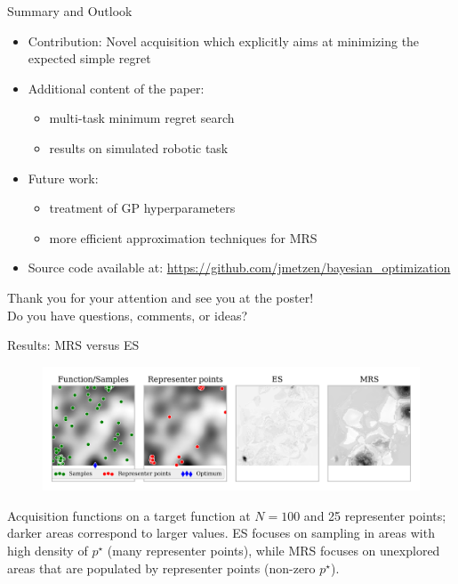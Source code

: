 \documentclass[11pt]{beamer}
\begin{document}
\begin{frame}{Summary and Outlook}
  
  \begin{itemize}
    \item Contribution: Novel acquisition which explicitly aims at minimizing the expected simple regret
    \pause
    \item Additional content of the paper:
    \begin{itemize}
      \item multi-task minimum regret search
      \item results on simulated robotic task
    \end{itemize}
    \pause
    \item Future work:
    \begin{itemize}
      \item treatment of GP hyperparameters
      \item more efficient approximation techniques for MRS
    \end{itemize}
    \pause
    \item Source code available at: \url{https://github.com/jmetzen/bayesian_optimization}
  \end{itemize}

  \vspace*{1cm}
  \pause
  \begin{center}
   Thank you for your attention and see you at the poster! \\
   Do you have questions, comments, or ideas?
   \end{center}

\end{frame}

\appendix

\begin{frame}[noframenumbering]{Results: MRS versus ES}
\begin{figure}
\centering
\includegraphics[width=.8\textwidth]{../pics/es_analysis}
\label{fig:es_analysis}
\end{figure}

Acquisition functions on a target function at $N=100$ and 25 representer points; darker areas correspond to larger values. ES focuses on sampling in areas with high density of $p^\star$ (many representer points), while MRS focuses on unexplored areas that are populated by representer points (non-zero $p^\star$).

\end{frame}
\end{document}
